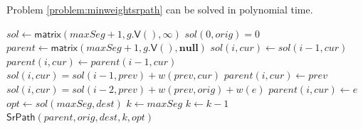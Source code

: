\begin{proposition}
Problem \ref{problem:minweightsrpath} can be solved in polynomial time. 
\end{proposition}

\begin{algorithm}[t]
\small
\caption{$\textsf{minWeightSrPath}\left( g, orig, dest, w, maxSeg \right)$}
\begin{algorithmic}[1]
\STATE $sol \gets \textsf{matrix}(maxSeg + 1, g.\textsf{V}(), \infty)$ \label{mwsrp-matrix}
\STATE $sol(0, orig) = 0$
\STATE $parent \gets \textsf{matrix}(maxSeg + 1, g.\textsf{V}(), \textbf{null})$
    \STATE $sol(i, cur) \gets sol(i - 1, cur)$
    \STATE $parent(i, cur) \gets parent(i - 1, cur)$
     \label{mwsrp-for1}
       \label{mwsrp-if1}
	\STATE $sol(i, cur) = sol(i - 1, prev) + w(prev, cur)$
	\STATE $parent(i, cur) \gets prev$
      \ENDIF
    \ENDFOR
	 \label{mwsrp-for2}
	   \label{mwsrp-if2}
	    \STATE $sol(i, cur) = sol(i - 2, prev) + w(prev, orig) + w(e)$
	    \STATE $parent(i, cur) \gets e$
	  \ENDIF
	\ENDFOR
      \ENDFOR
    \ENDIF
  \ENDFOR
\ENDFOR
\STATE $opt \gets sol(maxSeg, dest)$
\STATE $k \gets maxSeg$
  \STATE $k \gets k - 1$
\ENDWHILE
\RETURN $\textsf{SrPath}(parent, orig, dest, k, opt)$
\end{algorithmic}
\label{algo:min_weight_sr_path}
\end{algorithm}

% 

